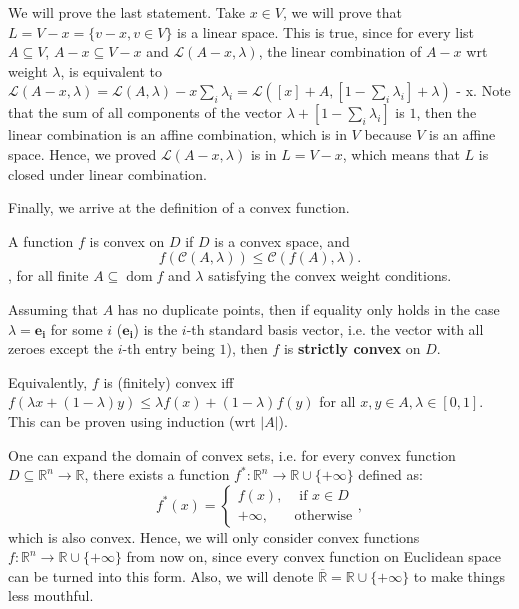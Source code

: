 We will prove the last statement. Take \( x \in V \), we will prove that \( L = V -
x = \{v - x, v \in V\}  \) is a linear space. This is true, since for every
list  \( A \subseteq V \), \( A - x \subseteq V - x \) and \( \mathcal{L}(A   -
x, \lambda) \), the linear combination of \( A-x \) wrt weight \( \lambda \),
is equivalent to \( \mathcal{L}(A-x, \lambda)  = \mathcal{L}(A, \lambda) - x
\sum_{i} \lambda_{i} = \mathcal{L}\left([x] + A, [1 - \sum_{i}
  \lambda_{i}] + \lambda\right)\) - x. Note that the sum of all components of the
  vector \(\lambda + [1 - \sum_{i} \lambda_{i}] \) is \( 1 \), then the linear
  combination is an affine combination, which is in \( V \) because \( V \) is an
  affine space. Hence, we proved \( \mathcal{L}(A-x, \lambda) \) is in \( L = V - x
  \), which means that \( L \) is closed under linear combination.


Finally, we arrive at the definition of a convex function.

\begin{definition}
  A function \( f \) is convex on \( D \) if \( D \) is a convex space, and
  \[
    f(\mathcal{C}(A, \lambda)) \le \mathcal{C}(f(A), \lambda)
  .\] , for all finite \( A \subseteq \operatorname{dom} f \) and \( \lambda \)
  satisfying the convex weight conditions.

  Assuming that \( A \) has no duplicate points, then if
  equality only holds in the case \( \lambda = \mathbf{e_{i}} \) for some \(
  i\) (\( \mathbf{e_{i}} \)) is the \( i \)-th standard basis vector, i.e. the
  vector with all zeroes except the \( i \)-th entry being \( 1 \)), then \( f
  \) is \textbf{strictly convex} on \( D \).
\end{definition}

Equivalently, \( f \) is (finitely) convex iff \( f(\lambda x + (1-\lambda)y) \le \lambda
f(x) + (1 - \lambda)f(y) \) for all \( x, y \in A, \lambda \in [0, 1] \). This
can be proven using induction (wrt \( |A| \)).

One can expand the domain of convex sets, i.e. for every convex function \( D
\subseteq \mathbb{R}^{n} \to  \mathbb{R} \), there exists a function \( f^{*}:
\mathbb{R}^{n} \to  \mathbb{R} \cup  \{+\infty\}   \)
defined as:
\[
  f^{*}(x) = \begin{cases}
    f(x), &\text{ if } x \in D\\
    +\infty, & \text{otherwise}
  \end{cases}
,\] which is also convex. Hence, we will only consider convex functions \( f:
\mathbb{R}^{n} \to  \mathbb{R} \cup \{+\infty\}   \) from now on, since every
convex function on Euclidean space can be turned into this form. Also, we will
denote \( \overline{\mathbb{R}} = \mathbb{R} \cup  \{+\infty\}    \) to make
things less mouthful.

